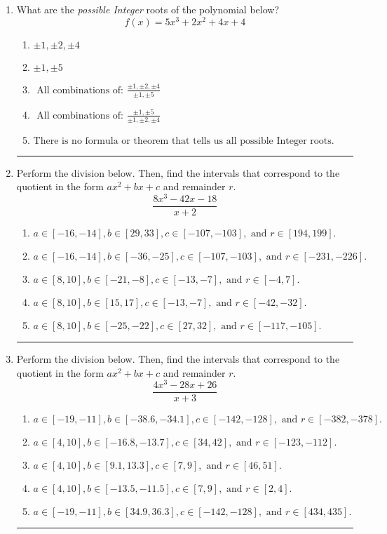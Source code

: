 \documentclass[14pt]{extbook}
\newcommand{\litem}[1]{\item#1\hspace*{-1cm}\rule{\textwidth}{0.4pt}}
\begin{document}
\begin{enumerate}
{\begin{enumerate}[label=\Alph*.]
\end{enumerate} }
\litem{
What are the \textit{possible Integer} roots of the polynomial below?\[ f(x) = 5x^{3} +2 x^{2} +4 x + 4 \]\begin{enumerate}[label=\Alph*.]
\item \( \pm 1,\pm 2,\pm 4 \)
\item \( \pm 1,\pm 5 \)
\item \( \text{ All combinations of: }\frac{\pm 1,\pm 2,\pm 4}{\pm 1,\pm 5} \)
\item \( \text{ All combinations of: }\frac{\pm 1,\pm 5}{\pm 1,\pm 2,\pm 4} \)
\item \( \text{There is no formula or theorem that tells us all possible Integer roots.} \)

\end{enumerate} }
\litem{
Perform the division below. Then, find the intervals that correspond to the quotient in the form $ax^2+bx+c$ and remainder $r$.\[ \frac{8x^{3} -42 x -18}{x + 2} \]\begin{enumerate}[label=\Alph*.]
\item \( a \in [-16, -14], b \in [29, 33], c \in [-107, -103], \text{ and } r \in [194, 199]. \)
\item \( a \in [-16, -14], b \in [-36, -25], c \in [-107, -103], \text{ and } r \in [-231, -226]. \)
\item \( a \in [8, 10], b \in [-21, -8], c \in [-13, -7], \text{ and } r \in [-4, 7]. \)
\item \( a \in [8, 10], b \in [15, 17], c \in [-13, -7], \text{ and } r \in [-42, -32]. \)
\item \( a \in [8, 10], b \in [-25, -22], c \in [27, 32], \text{ and } r \in [-117, -105]. \)

\end{enumerate} }
\litem{
Perform the division below. Then, find the intervals that correspond to the quotient in the form $ax^2+bx+c$ and remainder $r$.\[ \frac{4x^{3} -28 x + 26}{x + 3} \]\begin{enumerate}[label=\Alph*.]
\item \( a \in [-19, -11], b \in [-38.6, -34.1], c \in [-142, -128], \text{ and } r \in [-382, -378]. \)
\item \( a \in [4, 10], b \in [-16.8, -13.7], c \in [34, 42], \text{ and } r \in [-123, -112]. \)
\item \( a \in [4, 10], b \in [9.1, 13.3], c \in [7, 9], \text{ and } r \in [46, 51]. \)
\item \( a \in [4, 10], b \in [-13.5, -11.5], c \in [7, 9], \text{ and } r \in [2, 4]. \)
\item \( a \in [-19, -11], b \in [34.9, 36.3], c \in [-142, -128], \text{ and } r \in [434, 435]. \)

\end{enumerate} }
\end{enumerate}
\end{document}
